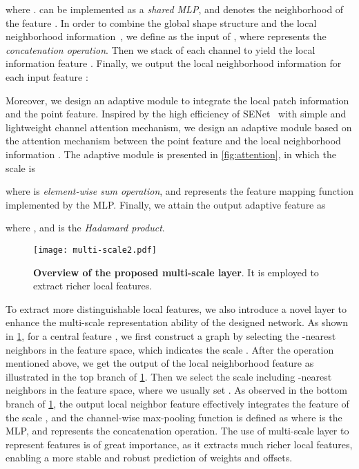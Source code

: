 \documentclass[runningheads]{llncs}
\begin{document}
where .  can be implemented as a \emph{shared MLP}, and  denotes the neighborhood of the feature .
In order to combine the global shape structure and
the local neighborhood information~\cite{wang2019dynamic}, we define  as the input of , where  represents the \emph{concatenation operation}. Then we stack   of each channel to yield the local information feature . Finally, we output the local neighborhood information for each input feature :

Moreover, we design an adaptive module to integrate the local patch information and the point feature. Inspired by the high efficiency of SENet~\cite{hu2018squeeze} with simple and lightweight channel attention mechanism, we design an adaptive module based on the attention mechanism between the point feature  and the local neighborhood information . The adaptive module is presented in \cref{fig:attention},  in which the scale is
 
where  is \emph{element-wise sum operation}, and  represents the feature mapping function implemented by the MLP. Finally, we attain the output adaptive feature  as
 
where , and  is the \emph{Hadamard product}. 

 \begin{figure}[t]
  \centering
   \texttt{[image: multi-scale2.pdf]}
   \caption{\textbf{Overview of the proposed multi-scale layer}. It is employed to extract richer local features.
   }
   \label{fig:multi-scale}
\end{figure}
 To extract more distinguishable local features, we also introduce a novel layer to enhance the multi-scale representation ability of the designed network. As shown in \cref{fig:multi-scale},
for a central feature , we first construct a graph by selecting the -nearest neighbors in the feature space, which indicates the scale . After the operation mentioned above, we get the output of the local neighborhood feature  as illustrated in the top branch of \cref{fig:multi-scale}. Then we select the scale  including -nearest neighbors in the feature space, where we usually set . As observed in the bottom branch of \cref{fig:multi-scale}, the output local neighbor feature  effectively integrates the feature  of the scale , and the channel-wise max-pooling function is defined as 
where  is the MLP, and  represents the concatenation operation. The use of multi-scale layer to represent features is of great importance, as it extracts much richer local features, enabling a more stable and robust prediction of weights and offsets.
\end{document}
